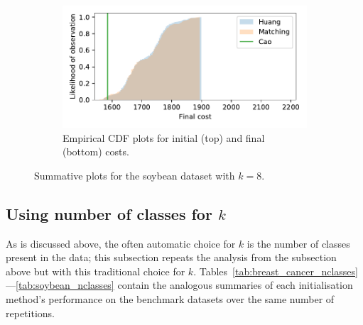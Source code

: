 \documentclass[11pt]{article}
\begin{document}
\begin{figure}
\begin{subfigure}{.5\textwidth}
        \includegraphics[width=\linewidth]{Fig4b2.pdf}
        \caption{Empirical CDF plots for initial (top) and final (bottom)
                 costs.}
    \end{subfigure}
    \caption{Summative plots for the soybean dataset with \(k=8\).}%
    \label{fig:soybean_knee}
\end{figure}


\subsection{Using number of classes for \(k\)}\label{subsec:nclasses}

As is discussed above, the often automatic choice for \(k\) is the number of
classes present in the data; this subsection repeats the analysis from the
subsection above but with this traditional choice for \(k\).
Tables~\ref{tab:breast_cancer_nclasses}---\ref{tab:soybean_nclasses}
contain the analogous summaries of each initialisation method's performance on
the benchmark datasets over the same number of repetitions.
\end{document}
